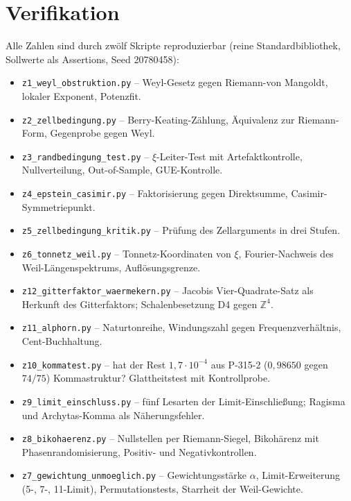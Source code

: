 \section{Verifikation}

Alle Zahlen sind durch zw\"olf Skripte reproduzierbar (reine
Standardbibliothek, Sollwerte als Assertions, Seed 20780458):

\begin{itemize}
  \item \texttt{z1\_weyl\_obstruktion.py} -- Weyl-Gesetz gegen
    Riemann-von Mangoldt, lokaler Exponent, Potenzfit.
  \item \texttt{z2\_zellbedingung.py} -- Berry-Keating-Z\"ahlung,
    \"Aquivalenz zur Riemann-Form, Gegenprobe gegen Weyl.
  \item \texttt{z3\_randbedingung\_test.py} -- $\xi$-Leiter-Test mit
    Artefaktkontrolle, Nullverteilung, Out-of-Sample, GUE-Kontrolle.
  \item \texttt{z4\_epstein\_casimir.py} -- Faktorisierung gegen
    Direktsumme, Casimir-Symmetriepunkt.
  \item \texttt{z5\_zellbedingung\_kritik.py} -- Pr\"ufung des
    Zellarguments in drei Stufen.
  \item \texttt{z6\_tonnetz\_weil.py} -- Tonnetz-Koordinaten von $\xi$,
    Fourier-Nachweis des Weil-L\"angenspektrums, Aufl\"osungsgrenze.
  \item \texttt{z12\_gitterfaktor\_waermekern.py} -- Jacobis
    Vier-Quadrate-Satz als Herkunft des Gitterfaktors;
    Schalenbesetzung D4 gegen $\mathbb{Z}^4$.
  \item \texttt{z11\_alphorn.py} -- Naturtonreihe, Windungszahl
    gegen Frequenzverh\"altnis, Cent-Buchhaltung.
  \item \texttt{z10\_kommatest.py} -- hat der Rest $1{,}7\cdot10^{-4}$ aus P-315-2
    ($0{,}98650$ gegen $74/75$) Kommastruktur? Glattheitstest mit Kontrollprobe.
  \item \texttt{z9\_limit\_einschluss.py} -- f\"unf Lesarten der
    Limit-Einschlie\ss ung; Ragisma und Archytas-Komma als
    N\"aherungsfehler.
  \item \texttt{z8\_bikohaerenz.py} -- Nullstellen per Riemann-Siegel,
    Bikoh\"arenz mit Phasenrandomisierung, Positiv- und
    Negativkontrollen.
  \item \texttt{z7\_gewichtung\_unmoeglich.py} -- Gewichtungsst\"arke
    $\alpha$, Limit-Erweiterung (5-, 7-, 11-Limit), Permutationstests,
    Starrheit der Weil-Gewichte.
\end{itemize}

